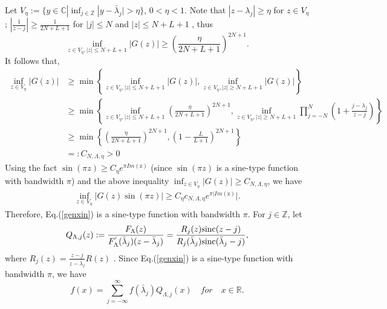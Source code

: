 \documentclass[a4paper]{article}
\numberwithin{equation}{section}
\begin{document}
Let $V_\eta:=\{y\in\mathbb{C}|\inf_{j\in\mathbb{Z}}|y-\bar{\lambda}_{j}|>\eta\}$, $0<\eta<1$. Note that $|z-\lambda_{j}|\ge\eta $ for $z\in V_\eta$; $|\frac{1}{z-j}|\ge \frac{1}{2N+L+1}$ for $|j|\le N$ and $|z|\le N+L+1$  , thus $$ \inf_{z\in V_\eta,|z|\le N+L+1}|G(z)|\ge \left(\frac{\eta}{2N+L+1}\right)^{2N+1}.$$ 
It follows that,  \begin{equation*}
\begin{split}
\inf_{z\in V_\eta} |G(z)|&\ge\min\left\{\inf_{z\in V_\eta,|z|\le N+L+1}|G(z)|,\inf_{z\in V_\eta,|z|\ge N+L+1}|G(z)|\right\}\\&\ge \min\left\{\inf_{z\in V_\eta,|z|\le N+L+1}\left(\frac{\eta}{2N+L+1}\right)^{2N+1},\inf_{z\in V_\eta,|z|\ge N+L+1}\prod_{j=-N}^{N}\left(1+\frac{j-\lambda_{j}}{z-j}\right)\right\}\\&\ge \min\left\{\left(\frac{\eta}{2N+L+1}\right)^{2N+1}, \left(1-\frac{L}{L+1}\right)^{2N+1}\right\}\\&=:C_{N,\Lambda,\eta}>0\end{split}\end{equation*} 
 Using the fact $\sin(\pi z)\ge C_{\eta}e^{\pi Im(\mathrm z)}$ (since $\sin(\pi z)$ is a sine-type function with bandwidth $\pi$) and the above inequality $\inf_{z\in V_\eta} |G(z)| \ge C_{N,\Lambda,\eta}$, we have \begin{equation*} \begin{split}
 \inf_{z\in V_\eta}|G(z)\sin(\pi z)|\ge C_{\eta}c_{N,\Lambda,\eta}e^{\pi|Im(\mathrm z)}|.\end{split}    \end{equation*} Therefore, Eq.(\ref{genxin}) is a sine-type function with bandwidth $\pi$.  For $j\in \mathbb{Z}$, let \begin{equation}\label{eq12}
Q_{\Lambda,j}(z):=\frac{ F_{\Lambda}(z) }{F_{\Lambda}^{'}(\bar{\lambda}_{j})(z-\bar{\lambda}_{j})}=\frac{R_{j}(z){\rm sinc}(z-j)}{R_{j}(\bar{\lambda}_{j}){\rm sinc}(\bar{\lambda}_{j}-j)},\end{equation}
where $R_{j}(z)=\frac{z-j}{z-\bar{\lambda}_{j}}R(z)$ . Since  Eq.(\ref{genxin}) is a sine-type function with bandwidth $\pi$, we have
\begin{equation}\label{eq44} f(x)= \sum_{j=-\infty}^{\infty}  f(\bar{\lambda}_{j})Q_{\Lambda,j}(x)\quad for \quad x\in \mathbb{R}. \end{equation}
\end{document}
